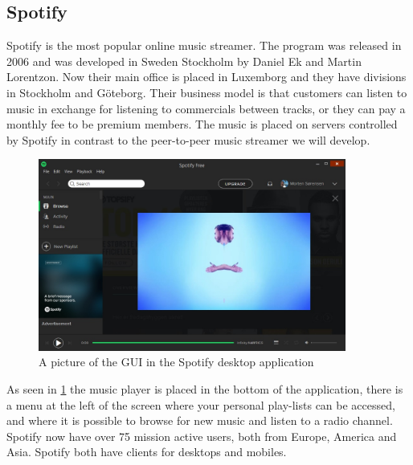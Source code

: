 \subsection{Spotify}
Spotify is the most popular online music streamer. The program was released in 2006 and was developed in Sweden Stockholm by Daniel Ek and Martin Lorentzon. Now their main office is placed in Luxemborg and they have divisions in Stockholm and Göteborg. Their business model is that customers can listen to music in exchange for listening to commercials between tracks, or they can pay a monthly fee to be premium members.
The music is placed on servers controlled by Spotify in contrast to the peer-to-peer music streamer we will develop.
\begin{figure}[h]
  \centering
    \includegraphics[width=0.9\textwidth]{gfx/Spotify_desktop.jpg}
  \caption{A picture of the \acs{GUI} in the Spotify desktop application}
  \label{fig:spotify}
\end{figure}
As seen in \ref{fig:spotify} the music player is placed in the bottom of the application, there is a menu at the left of the screen where your personal play-lists can be accessed, and where it is possible to browse for new music and listen to a radio channel.
Spotify now have over 75 mission active users, both from Europe, America and Asia. Spotify both have clients for desktops and mobiles.

